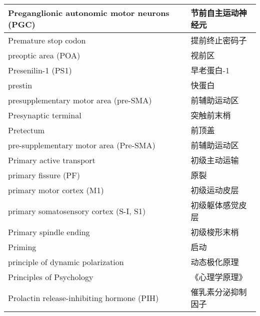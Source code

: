 \begin{longtable}{lll}
	\midrule
	Preganglionic autonomic motor neurons (PGC)     && 	节前自主运动神经元   \\
	
	\midrule
	Premature stop codon     && 	提前终止密码子   \\
	
	\midrule
	preoptic area (POA)     && 	视前区   \\
	
	\midrule
	Presenilin-1 (PS1)     && 	早老蛋白-1   \\
	
	\midrule
	prestin     && 	快蛋白   \\
	
	\midrule
	presupplementary motor area (pre-SMA)    && 	前辅助运动区   \\
	
	\midrule
	Presynaptic terminal     && 	突触前末梢   \\
	
	\midrule
	Pretectum     && 	前顶盖   \\
	
	\midrule
	pre-supplementary motor area (Pre-SMA)     && 	前辅助运动区   \\
	
	\midrule
	Primary active transport   && 初级主动运输  \\
	
	\midrule
	primary fissure (PF)   && 原裂  \\
	
	\midrule
	primary motor cortex (M1)   && 初级运动皮层  \\
	
	\midrule
	primary somatosensory cortex (S-I, S1)   && 初级躯体感觉皮层  \\
	
	\midrule
	Primary spindle ending   && 初级梭形末梢  \\
	
	\midrule
	Priming   && 启动  \\
	
	\midrule
	principle of dynamic polarization   && 动态极化原理  \\
	
	\midrule
	Principles of Psychology   && 《心理学原理》  \\
	
	\midrule
	Prolactin release-inhibiting hormone (PIH)  && 催乳素分泌抑制因子  \\
	

\end{longtable}

